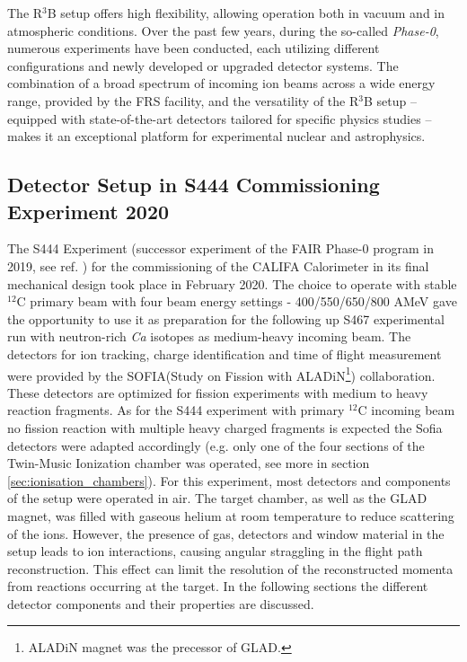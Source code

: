 The R$^3$B setup offers high flexibility, allowing operation both in vacuum and in atmospheric conditions. Over the past few years, during the so-called \textit{Phase-0}, numerous experiments have been conducted, each utilizing different configurations and newly developed or upgraded detector systems.\newline  
The combination of a broad spectrum of incoming ion beams across a wide energy range, provided by the FRS facility, and the versatility of the R$^3$B setup -- equipped with state-of-the-art detectors tailored for specific physics studies -- makes it an exceptional platform for experimental nuclear and astrophysics.

\subsection{Detector Setup in S444 Commissioning Experiment 2020}
The S444 Experiment (successor experiment of the FAIR Phase-0 program in 2019, see ref. \cite{ponnath2024measurement}) for the commissioning of the CALIFA Calorimeter in its final mechanical design took place in February 2020. The choice to operate with stable $^{12}$C primary beam with four beam energy settings - 400/550/650/800 AMeV  gave the opportunity to use it as preparation for the following up S467 experimental run with neutron-rich \textit{Ca} isotopes as medium-heavy incoming beam. The detectors for ion tracking, charge identification and time of flight measurement were provided by the SOFIA(Study on Fission with ALADiN\footnote{ALADiN magnet was the precessor of GLAD.}) collaboration. These detectors are optimized for fission experiments with medium to heavy reaction fragments. As for the S444 experiment with primary $^{12}$C incoming beam no fission reaction with multiple heavy charged fragments is expected the Sofia detectors were adapted accordingly (e.g. only one of the four sections of the Twin-Music Ionization chamber was operated, see more in section \ref{sec:ionisation_chambers}).\newline
For this experiment, most detectors and components of the setup were operated in air. The target chamber, as well as the GLAD magnet, was filled with gaseous helium at room temperature to reduce scattering of the ions.\newline 
However, the presence of gas, detectors and window material in the setup leads to ion interactions, causing angular straggling in the flight path reconstruction. This effect can limit the resolution of the reconstructed momenta from reactions occurring at the target.\newline
In the following sections the different detector components and their properties are discussed.\newline

